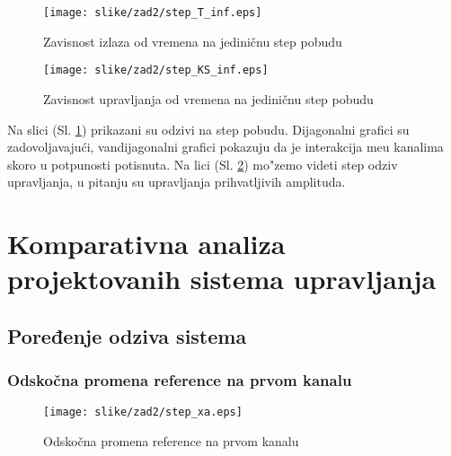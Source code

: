 \documentclass[a4paper,11pt]{article}
\theoremstyle{definition} \newtheorem{deff}{Definicija}[section]
\theoremstyle{definition} \newtheorem{prim}[deff]{Primer}
\theoremstyle{plain} \newtheorem{teor}[deff]{Teorema}
\begin{document}
			\clearpage
			
			
			
			\begin{figure}[!ht]
				\centering
				\texttt{[image: slike/zad2/step\_T\_inf.eps]}
				\caption{Zavisnost izlaza od vremena na jediničnu step pobudu}
				\label{fig:stepT_inf}
			\end{figure}
			
			\begin{figure}[!ht]
				\centering
				\texttt{[image: slike/zad2/step\_KS\_inf.eps]}
				\caption{Zavisnost upravljanja od vremena na jediničnu step pobudu}
				\label{fig:stepKS_inf}
			\end{figure}
			
			Na slici (Sl. \ref{fig:stepT_inf}) prikazani su odzivi na step pobudu. Dijagonalni grafici su zadovoljavajući, vandijagonalni grafici pokazuju da je interakcija me\dj{}u kanalima skoro u potpunosti potisnuta. Na lici (Sl. \ref{fig:stepKS_inf}) mo"zemo videti step odziv upravljanja, u pitanju su upravljanja prihvatljivih amplituda.
			
			
			
			
			\newpage
			
			\section{Komparativna analiza projektovanih sistema upravljanja}
			
			\subsection{Poređenje odziva sistema}
			\subsubsection{Odskočna promena reference na prvom kanalu}
			\begin{figure}[!ht]
				\centering
				\texttt{[image: slike/zad2/step\_xa.eps]}
				\caption{Odskočna promena reference na prvom kanalu}
				\label{fig:step_xa}
			\end{figure}
			
\end{document}
